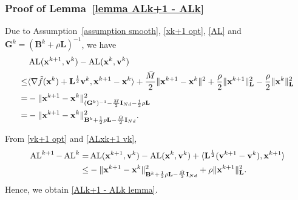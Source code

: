 \documentclass[10pt,a4paper]{amsart}
\begin{document}
\subsubsection{Proof of Lemma~\ref{lemma ALk+1 - ALk}}\label{proof lemma ALk+1 - ALk}
Due to Assumption~\ref{assumption smooth}, \eqref{xk+1 opt}, \eqref{AL} and $\mathbf{G}^k=(\mathbf{B}^k+\rho \mathbf{L})^{-1}$, we have
\begin{align}
	& \operatorname{AL}(\mathbf{x}^{k+1},\mathbf{v}^{k})-\operatorname{AL}(\mathbf{x}^{k},\mathbf{v}^{k})\notag\\
	{\leq}& \langle \nabla \tilde{f}(\mathbf{x}^k)+\mathbf{L}^{\frac{1}{2}}\mathbf{v}^k,\mathbf{x}^{k+1}-\mathbf{x}^k \rangle + \frac{\bar{M}}{2}\|\mathbf{x}^{k+1}-\mathbf{x}^k\|^2  + \frac{\rho}{2}\|\mathbf{x}^{k+1}\|^2_\mathbf{L} - \frac{\rho}{2}\|\mathbf{x}^{k}\|^2_\mathbf{L} \notag\\
	=& -\|\mathbf{x}^{k+1}-\mathbf{x}^k\|^2_{(\mathbf{G}^k)^{-1}-\frac{\bar{M}}{2}\mathbf{I}_{Nd}-\frac{1}{2}\rho \mathbf{L}}\notag\\
	=& -\|\mathbf{x}^{k+1}-\mathbf{x}^k\|^2_{\mathbf{B}^k+\frac{1}{2}\rho \mathbf{L}-\frac{\bar{M}}{2}\mathbf{I}_{Nd}}. \label{ALxk+1 vk}
\end{align}

From \eqref{vk+1 opt} and \eqref{ALxk+1 vk},
\vspace{-0.2cm}
\begin{align*}
	\operatorname{AL}^{k+1} - \operatorname{AL}^k =
    & \operatorname{AL}(\mathbf{x}^{k+1},\mathbf{v}^{k})-\operatorname{AL}(\mathbf{x}^{k},\mathbf{v}^{k}) + \langle \mathbf{L}^{\frac{1}{2}}(\mathbf{v}^{k+1}-\mathbf{v}^k),\mathbf{x}^{k+1}\rangle \notag\\
	{\leq} & -\|\mathbf{x}^{k+1}-\mathbf{x}^{k}\|^2_{\mathbf{B}^k+\frac{1}{2}\rho \mathbf{L} -\frac{\bar{M}}{2}\mathbf{I}_{Nd}} + \rho\|\mathbf{x}^{k+1}\|^2_\mathbf{L} .
\end{align*}
Hence, we obtain \eqref{ALk+1 - ALk lemma}.
\end{document}
